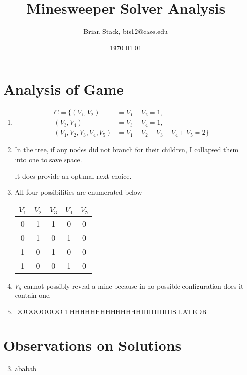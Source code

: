 \documentclass[11pt,letterpaper,notitlepage]{report}
\title{Minesweeper Solver Analysis}
\author{Brian Stack, bis12@case.edu}
\date{\today}
\begin{document}
\maketitle
\section*{Analysis of Game}
\begin{enumerate}
\item 
\begin{align*}
C = \{ (V_1, V_2) &= V_1 + V_2 = 1,\\
       (V_3, V_4) &= V_3 + V_4 = 1,\\
       (V_1, V_2, V_3, V_4, V_5) &= V_1 + V_2 + V_3 + V_4 + V_5 = 2\}
\end{align*}
\item In the tree, if any nodes did not branch for their children, I collapsed them into one to save space.\\ %
\begin{center}
\end{center}
It does provide an optimal next choice.
\item All four possibilities are enumerated below\\
\begin{tabular}{ccccc}
$V_1$&$V_2$&$V_3$&$V_4$&$V_5$\\\hline
0&1&1&0&0\\
0&1&0&1&0\\
1&0&1&0&0\\
1&0&0&1&0
\end{tabular}
\item $V_5$ cannot possibly reveal a mine because in no possible configuration does it contain one.
\item DOOOOOOOO THHHHHHHHHHHHHHIIIIIIIIIIIIS LATEDR
\end{enumerate}
\section*{Observations on Solutions}
\begin{enumerate}
\setcounter{enumi}{2}
\item ababab
\end{enumerate}
\end{document}
